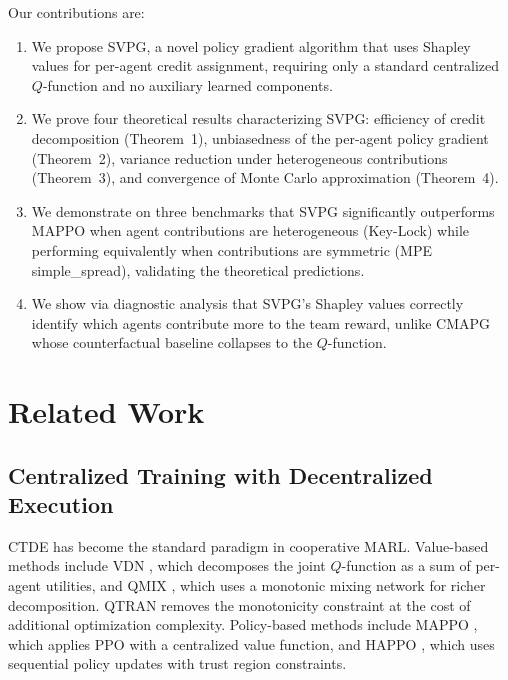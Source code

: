 \documentclass[11pt,a4paper]{article}
\begin{document}
Our contributions are:
\begin{enumerate}[leftmargin=*]
    \item We propose SVPG, a novel policy gradient algorithm that uses Shapley values for per-agent credit assignment, requiring only a standard centralized $Q$-function and no auxiliary learned components.
    \item We prove four theoretical results characterizing SVPG: efficiency of credit decomposition (Theorem~1), unbiasedness of the per-agent policy gradient (Theorem~2), variance reduction under heterogeneous contributions (Theorem~3), and convergence of Monte Carlo approximation (Theorem~4).
    \item We demonstrate on three benchmarks that SVPG significantly outperforms MAPPO when agent contributions are heterogeneous (Key-Lock) while performing equivalently when contributions are symmetric (MPE simple\_spread), validating the theoretical predictions.
    \item We show via diagnostic analysis that SVPG's Shapley values correctly identify which agents contribute more to the team reward, unlike CMAPG whose counterfactual baseline collapses to the $Q$-function.
\end{enumerate}

\section{Related Work}

\subsection{Centralized Training with Decentralized Execution}

CTDE has become the standard paradigm in cooperative MARL. Value-based methods include VDN \cite{sunehag2018vdn}, which decomposes the joint $Q$-function as a sum of per-agent utilities, and QMIX \cite{rashid2018qmix}, which uses a monotonic mixing network for richer decomposition. QTRAN \cite{son2019qtran} removes the monotonicity constraint at the cost of additional optimization complexity. Policy-based methods include MAPPO \cite{yu2022surprising}, which applies PPO with a centralized value function, and HAPPO \cite{kuba2022happo}, which uses sequential policy updates with trust region constraints.
\end{document}
